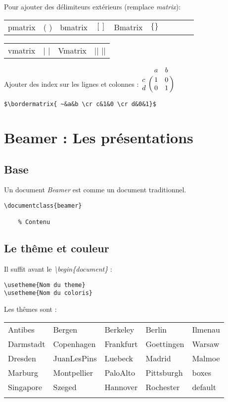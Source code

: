         Pour ajouter des délimiteurs extérieurs (remplace \textit{matrix}):
        \begin{center}
            \begin{tabular}{l r | l r | l r | l r | l r }
                pmatrix & ( ) & bmatrix & $[ ]$ & Bmatrix & $\{ \}$ \\
            \end{tabular}
            \begin{tabular}{l r | l r }
                vmatrix & | | & Vmatrix & || || \\
            \end{tabular}
        \end{center}
        Ajouter des index sur les lignes et colonnes : $\bordermatrix{ ~ & a & b \cr c & 1 & 0 \cr d & 0 & 1 }$
        \begin{lstlisting}
$\bordermatrix{ ~&a&b \cr c&1&0 \cr d&0&1}$
        \end{lstlisting}





\section{Beamer : Les présentations}
    \subsection{Base}
        Un document \textit{Beamer} est comme un document traditionnel.
        \begin{lstlisting}
\documentclass{beamer}

    % Contenu

        \end{lstlisting}
    \subsection{Le thême et couleur}
        Il suffit avant le \textit{\textbackslash begin\{document\}} :
        \begin{lstlisting}
\usetheme{Nom du theme}
\usetheme{Nom du coloris}
        \end{lstlisting}

        Les thêmes sont :\\
        \begin{tabular}{l l l l l}
            Antibes & Bergen & Berkeley & Berlin & Ilmenau\\
            Darmstadt & Copenhagen & Frankfurt & Goettingen & Warsaw\\
            Dresden & JuanLesPins & Luebeck & Madrid & Malmoe\\
            Marburg & Montpellier & PaloAlto & Pittsburgh & boxes\\
            Singapore & Szeged & Hannover & Rochester & default\\\\
        \end{tabular}

